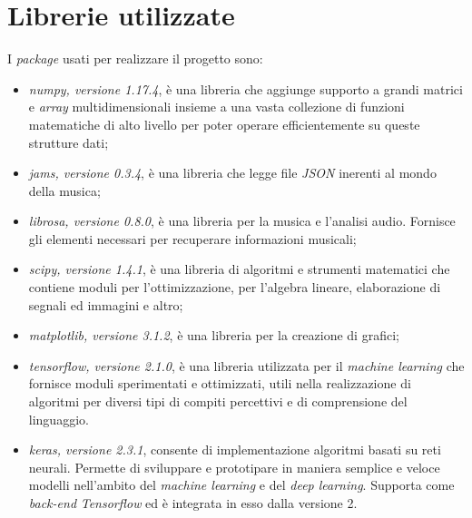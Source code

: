 \section{Librerie utilizzate}
I \textit{package} usati per realizzare il progetto sono:
\begin{itemize}
	\item \textit{numpy, versione 1.17.4}, è una libreria che aggiunge supporto a grandi matrici e \textit{array} multidimensionali insieme a una vasta collezione di funzioni matematiche di alto livello per poter operare efficientemente su queste strutture dati;
	\item \textit{jams, versione 0.3.4}, è una libreria che legge file \textit{JSON} inerenti al mondo della musica;
	\item \textit{librosa, versione 0.8.0}, è una libreria per la musica e l'analisi audio. Fornisce gli elementi necessari per recuperare informazioni musicali;
	\item \textit{scipy, versione 1.4.1}, è una libreria di algoritmi e strumenti matematici che contiene moduli per l'ottimizzazione, per l'algebra lineare, elaborazione di segnali ed immagini e altro;
	\item \textit{matplotlib, versione 3.1.2}, è una libreria per la creazione di grafici;
	\item \textit{tensorflow, versione 2.1.0}, è una libreria utilizzata per il \textit{machine learning} che fornisce moduli sperimentati e ottimizzati, utili nella realizzazione di algoritmi per diversi tipi di compiti percettivi e di comprensione del linguaggio.
	\item \textit{keras, versione 2.3.1}, consente di implementazione algoritmi basati su reti neurali. Permette di sviluppare e prototipare in maniera semplice e veloce modelli nell’ambito del \textit{machine learning} e del \textit{deep learning}. Supporta come \textit{back-end} \textit{Tensorflow} ed è integrata in esso dalla versione 2.
\end{itemize}

